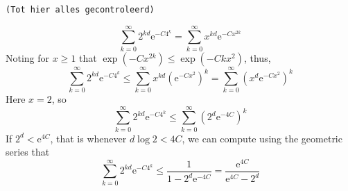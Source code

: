 \documentclass{amsart}
\theoremstyle{remark}
\renewcommand{\leq}{\leqslant}
\renewcommand{\leq}{\leqslant}
\renewcommand{\geq}{\geqslant}
\newcommand{\e}{\mathrm{e}} %
\renewcommand{\leq}{\leqslant}%
\renewcommand{\geq}{\geqslant}%
\newcommand{\red}{\color{red}}
\begin{document}
\begin{center}

  {\tt \red (Tot hier alles gecontroleerd)}
  
\end{center}


\begin{equation*}
  \sum_{k = 0}^\infty 2^{kd} \e^{-C 4^k} = \sum_{k = 0}^\infty x^{kd} \e^{-C x^{2k}}
\end{equation*}
Noting for $x \geq 1$ that $\exp(-C x^{2k}) \leq \exp(-C k x^2)$,
thus,
\begin{equation*}
  \sum_{k = 0}^\infty 2^{kd} \e^{-C 4^k} \leq \sum_{k = 0}^\infty
  x^{kd} (\e^{-C x^2})^k = \sum_{k = 0}^\infty (x^{d} \e^{-C x^2})^k
\end{equation*}
Here $x = 2$, so
\begin{equation*}
  \sum_{k = 0}^\infty 2^{kd} \e^{-C 4^k} \leq \sum_{k = 0}^\infty
  (2^d \e^{-4 C})^k
\end{equation*}
If $2^d < \e^{4C}$, that is whenever $d \log 2 < 4C$, we can compute
using the geometric series that
\begin{equation*}
  \sum_{k = 0}^\infty 2^{kd} \e^{-C 4^k} \leq \frac1{1 - 2^d
    \e^{-4C}} = \frac{\e^{4C}}{\e^{4C} - 2^d}
\end{equation*}



\end{document}
